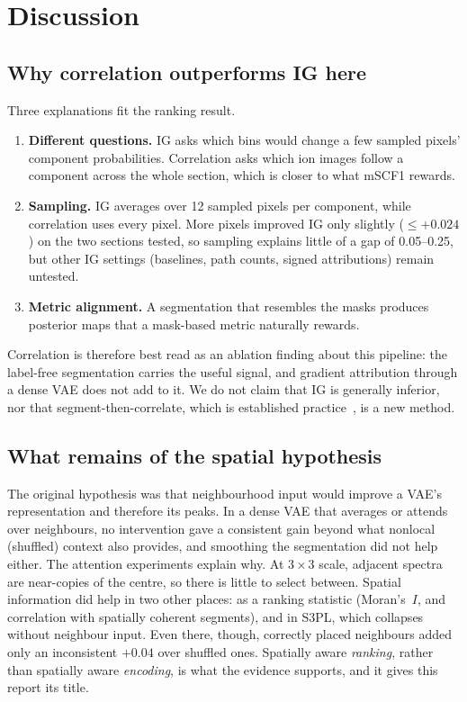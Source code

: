 \section{Discussion}
\label{sec:discussion}

\subsection{Why correlation outperforms IG here}
Three explanations fit the ranking result.
\begin{enumerate}
  \item \textbf{Different questions.} IG asks which bins would change a few
        sampled pixels' component probabilities. Correlation asks which ion
        images follow a component across the whole section, which is closer to
        what mSCF1 rewards.
  \item \textbf{Sampling.} IG averages over 12 sampled pixels per component,
        while correlation uses every pixel. More pixels improved IG only
        slightly ($\le +0.024$) on the two sections tested, so sampling
        explains little of a gap of 0.05--0.25, but other IG settings
        (baselines, path counts, signed attributions) remain untested.
  \item \textbf{Metric alignment.} A segmentation that resembles the masks
        produces posterior maps that a mask-based metric naturally rewards.
\end{enumerate}
Correlation is therefore best read as an ablation finding about this pipeline:
the label-free segmentation carries the useful signal, and gradient attribution
through a dense VAE does not add to it. We do not claim that IG is generally
inferior, nor that segment-then-correlate, which is established
practice~\citep{alexandrov2011efficient}, is a new method.

\subsection{What remains of the spatial hypothesis}
The original hypothesis was that neighbourhood input would improve a VAE's
representation and therefore its peaks. In a dense VAE that averages or attends
over neighbours, no intervention gave a consistent gain beyond what nonlocal
(shuffled) context also provides, and smoothing the segmentation did not help
either. The attention experiments explain why. At $3\times3$ scale, adjacent
spectra are near-copies of the centre, so there is little to select between.
Spatial information did help in two other places: as a ranking statistic
(Moran's~$I$, and correlation with spatially coherent segments), and in S3PL,
which collapses without neighbour input. Even there, though, correctly placed
neighbours added only an inconsistent $+0.04$ over shuffled ones. Spatially
aware \emph{ranking}, rather than spatially aware \emph{encoding}, is what the
evidence supports, and it gives this report its title.

